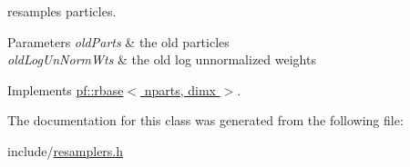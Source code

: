 resamples particles. 


\begin{DoxyParams}{Parameters}
{\em old\+Parts} & the old particles \\
\hline
{\em old\+Log\+Un\+Norm\+Wts} & the old log unnormalized weights \\
\hline
\end{DoxyParams}


Implements \hyperlink{classpf_1_1rbase_a0d8136638281a96a8c01b07393af9fc8}{pf\+::rbase$<$ nparts, dimx $>$}.



The documentation for this class was generated from the following file\+:\begin{DoxyCompactItemize}
\item 
include/\hyperlink{resamplers_8h}{resamplers.\+h}\end{DoxyCompactItemize}

